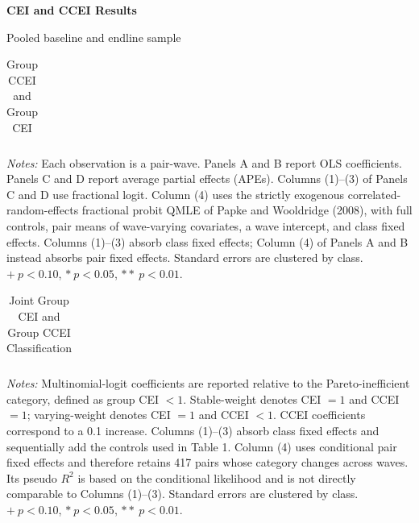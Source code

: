 \documentclass[11pt]{article}
\begin{document}
\begin{center}
  {\Large\bfseries CEI and CCEI Results}\par
  \vspace{2pt}
  {\small Pooled baseline and endline sample}
\end{center}

\vspace{4pt}

\begin{table}[H]
\centering
\caption{Group CCEI and Group CEI}
\label{tab:cei-ccei-separate}
\begin{threeparttable}
\footnotesize
\renewcommand{\arraystretch}{0.86}
\setlength{\tabcolsep}{7.5pt}
\begin{tabular}{lcccc}
\toprule

\end{tabular}
\begin{tablenotes}[flushleft]
\scriptsize
\item \textit{Notes:} Each observation is a pair-wave. Panels A and B report OLS coefficients. Panels C and D report average partial effects (APEs). Columns (1)--(3) of Panels C and D use fractional logit. Column (4) uses the strictly exogenous correlated-random-effects fractional probit QMLE of Papke and Wooldridge (2008), with full controls, pair means of wave-varying covariates, a wave intercept, and class fixed effects. Columns (1)--(3) absorb class fixed effects; Column (4) of Panels A and B instead absorbs pair fixed effects. Standard errors are clustered by class. $+\ p<0.10$, $*\ p<0.05$, $**\ p<0.01$.
\end{tablenotes}
\end{threeparttable}
\end{table}

\clearpage

\begin{table}[H]
\centering
\caption{Joint Group CEI and Group CCEI Classification}
\label{tab:cei-ccei-joint}
\begin{threeparttable}
\small
\renewcommand{\arraystretch}{0.91}
\setlength{\tabcolsep}{7.5pt}
\begin{tabular}{lcccc}
\toprule

\end{tabular}
\begin{tablenotes}[flushleft]
\scriptsize
\item \textit{Notes:} Multinomial-logit coefficients are reported relative to the Pareto-inefficient category, defined as group CEI $<1$. Stable-weight denotes CEI $=1$ and CCEI $=1$; varying-weight denotes CEI $=1$ and CCEI $<1$. CCEI coefficients correspond to a 0.1 increase. Columns (1)--(3) absorb class fixed effects and sequentially add the controls used in Table 1. Column (4) uses conditional pair fixed effects and therefore retains 417 pairs whose category changes across waves. Its pseudo $R^2$ is based on the conditional likelihood and is not directly comparable to Columns (1)--(3). Standard errors are clustered by class. $+\ p<0.10$, $*\ p<0.05$, $**\ p<0.01$.
\end{tablenotes}
\end{threeparttable}
\end{table}
\end{document}

